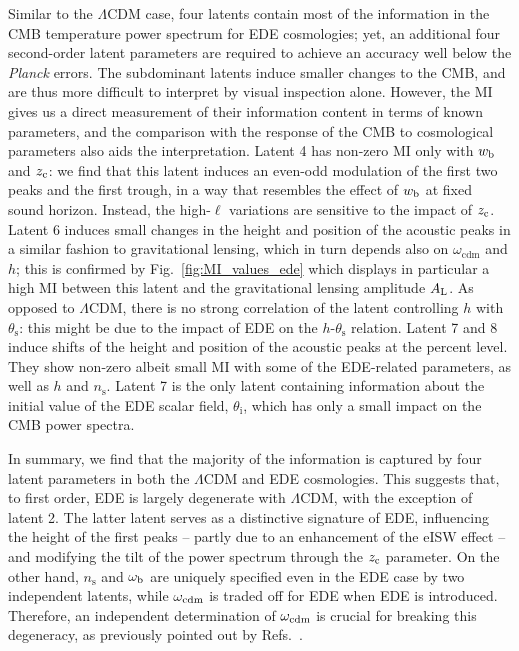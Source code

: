 \documentclass[aps, prd, reprint, superscriptaddress, nofootinbib, bibnotes]{revtex4-2}
\newcommand{\Planck}{\textit{Planck}}
\begin{document}
Similar to the $\Lambda$CDM case, four latents contain most of the information in the CMB temperature power spectrum for EDE cosmologies; yet, an additional four second-order latent parameters are required to achieve an accuracy well below the \Planck{} errors.
The subdominant latents induce smaller changes to the CMB, and are thus more difficult to interpret by visual inspection alone. However, the MI gives us a direct measurement of their information content in terms of known parameters, and the comparison with the response of the CMB to cosmological parameters also aids the interpretation. Latent 4 has non-zero MI only with $w_{\rm{b}}$ and $z_{\rm{c}}$: we find that this latent induces an even-odd modulation of the first two peaks and the first trough, in a way that resembles the effect of $w_{\rm{b}}$ at fixed sound horizon. Instead, the high-$\ell$ variations are sensitive to the impact of $z_{\rm{c}}$.
Latent 6 induces small changes in the height and position of the acoustic peaks in a similar fashion to gravitational lensing, which in turn depends also on $\omega_\mathrm{cdm}$ and $h$; this is confirmed by Fig.~\ref{fig:MI_values_ede} which displays in particular a high MI between this latent and the gravitational lensing amplitude $A_{\rm L}$. As opposed to $\Lambda$CDM, there is no strong correlation of the latent controlling $h$ with $\theta_\mathrm{s}$: this might be due to the impact of EDE on the $h$-$\theta_\mathrm{s}$ relation.
Latent 7 and 8 induce shifts of the height and position of the acoustic peaks at the percent level. They show non-zero albeit small MI with some of the EDE-related parameters, as well as $h$ and $n_\mathrm{s}$. Latent 7 is the only latent containing information about the initial value of the EDE scalar field, $\theta_\mathrm{i}$, which has only a small impact on the CMB power spectra. 

In summary, we find that the majority of the information is captured by four latent parameters in both the $\Lambda$CDM and EDE cosmologies. This suggests that, to first order, EDE is largely degenerate with $\Lambda$CDM, with the exception of latent 2. The latter latent serves as a distinctive signature of EDE, influencing the height of the first peaks -- partly due to an enhancement of the eISW effect -- and modifying the tilt of the power spectrum through the $z_{\rm c}$ parameter. On the other hand, $n_\mathrm{s}$ and $\omega_{\rm b}$ are uniquely specified even in the EDE case by two independent latents, while $ \omega_{\rm cdm}$ is traded off for EDE when EDE is introduced. Therefore, an independent determination of $\omega_{\rm cdm}$ is crucial for breaking this degeneracy, as previously pointed out by Refs.~\cite{Poulin:2024ken, Pedrotti:2024kpn}. 
\end{document}
